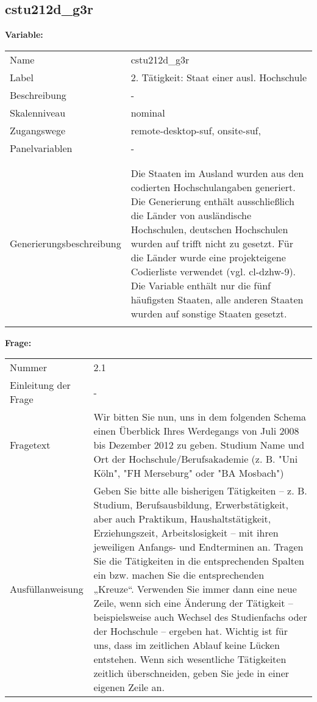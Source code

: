 	
	
	\subsection{cstu212d\_g3r}
	\label{subSection:cstu212d_g3r}

	\noindent\textbf{Variable:}\\
		\begin{tabular}{lL{11.3cm}}
			\label{tableVariable:cstu212d_g3r}
			Name & cstu212d\_g3r \\
			Label & 2. Tätigkeit: Staat einer ausl. Hochschule \\
			Beschreibung & - \\
			Skalenniveau & nominal \\
			Zugangswege &
				remote-desktop-suf,
				onsite-suf,
 \\
			Panelvariablen & -
			 \\
			 \\
 \\
					Generierungsbeschreibung & Die Staaten im Ausland wurden aus den codierten Hochschulangaben generiert. Die Generierung enthält ausschließlich die Länder von ausländische Hochschulen, deutschen Hochschulen wurden auf trifft nicht zu gesetzt. Für die Länder wurde eine projekteigene Codierliste verwendet (vgl. cl-dzhw-9). Die Variable enthält nur die fünf häufigsten Staaten, alle anderen Staaten wurden auf sonstige Staaten gesetzt. 
				 \\	
			 \\
		\end{tabular}

		\vspace*{1 cm}
		\noindent\textbf{Frage:}\\
		\begin{tabular}{lL{11.3cm}}
			\label{tableQuestion:cstu212d_g3r}
			Nummer & 2.1 \\
			Einleitung der Frage & - \\
			Fragetext & Wir bitten Sie nun, uns in dem folgenden Schema einen Überblick Ihres Werdegangs von Juli 2008 bis Dezember 2012 zu geben.
Studium
Name und Ort der Hochschule/Berufsakademie
(z. B. "Uni Köln", "FH Merseburg" oder "BA Mosbach") \\
			Ausfüllanweisung & Geben Sie bitte alle bisherigen Tätigkeiten – z. B. Studium, Berufsausbildung, Erwerbstätigkeit, aber auch Praktikum, Haushaltstätigkeit,
Erziehungszeit, Arbeitslosigkeit – mit ihren jeweiligen Anfangs- und Endterminen an. Tragen Sie die Tätigkeiten in die entsprechenden Spalten ein bzw. machen Sie die entsprechenden „Kreuze“. Verwenden Sie immer dann eine neue Zeile, wenn sich eine Änderung der Tätigkeit – beispielsweise auch Wechsel des Studienfachs oder der Hochschule – ergeben hat. Wichtig ist für uns, dass im zeitlichen Ablauf keine Lücken entstehen. Wenn sich wesentliche Tätigkeiten zeitlich überschneiden, geben Sie jede in einer eigenen Zeile an. \\
		\end{tabular}





